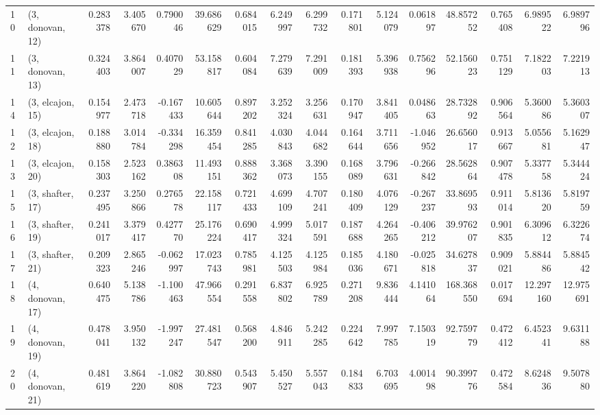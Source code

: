 \begin{tabular}{llrrrrrrrrrrrrrr}
10 &  (3, donovan, 12) &   0.283378 &  3.405670 &  0.790046 &  39.686629 &  0.684015 &   6.249997 &  6.299732 &  0.171801 &  5.124079 &  0.061897 &   48.857252 &  0.765408 &   6.989522 &   6.989796 \\
11 &  (3, donovan, 13) &   0.324403 &  3.864007 &  0.407029 &  53.158817 &  0.604084 &   7.279639 &  7.291009 &  0.181393 &  5.396938 &  0.756296 &   52.156023 &  0.751129 &   7.182203 &   7.221913 \\
14 &  (3, elcajon, 15) &   0.154977 &  2.473718 & -0.167433 &  10.605644 &  0.897202 &   3.252324 &  3.256631 &  0.170947 &  3.841405 &  0.048663 &   28.732892 &  0.906564 &   5.360086 &   5.360307 \\
12 &  (3, elcajon, 18) &   0.188880 &  3.014784 & -0.334298 &  16.359454 &  0.841285 &   4.030843 &  4.044682 &  0.164644 &  3.711656 & -1.046952 &   26.656017 &  0.913667 &   5.055681 &   5.162947 \\
13 &  (3, elcajon, 20) &   0.158303 &  2.523162 &  0.386308 &  11.493151 &  0.888362 &   3.368073 &  3.390155 &  0.168089 &  3.796631 & -0.266842 &   28.562864 &  0.907478 &   5.337758 &   5.344424 \\
15 &  (3, shafter, 17) &   0.237495 &  3.250866 &  0.276578 &  22.158117 &  0.721433 &   4.699109 &  4.707241 &  0.180409 &  4.076129 & -0.267237 &   33.869593 &  0.911014 &   5.813620 &   5.819759 \\
16 &  (3, shafter, 19) &   0.241017 &  3.379417 &  0.427770 &  25.176224 &  0.690417 &   4.999324 &  5.017591 &  0.187688 &  4.264265 & -0.406212 &   39.976207 &  0.901835 &   6.309612 &   6.322674 \\
17 &  (3, shafter, 21) &   0.209323 &  2.865246 & -0.062997 &  17.023743 &  0.785981 &   4.125503 &  4.125984 &  0.185036 &  4.180671 & -0.025818 &   34.627837 &  0.909021 &   5.884486 &   5.884542 \\
18 &  (4, donovan, 17) &   0.640475 &  5.138786 & -1.100463 &  47.966554 &  0.291558 &   6.837802 &  6.925789 &  0.271208 &  9.836444 &  4.141064 &  168.368550 &  0.017694 &  12.297160 &  12.975691 \\
19 &  (4, donovan, 19) &   0.478041 &  3.950132 & -1.997247 &  27.481547 &  0.568200 &   4.846911 &  5.242285 &  0.224642 &  7.997785 &  7.150319 &   92.759779 &  0.472412 &   6.452341 &   9.631188 \\
20 &  (4, donovan, 21) &   0.481619 &  3.864220 & -1.082808 &  30.880723 &  0.543907 &   5.450527 &  5.557043 &  0.184833 &  6.703695 &  4.001498 &   90.399776 &  0.472584 &   8.624836 &   9.507880 \\

\end{tabular}
